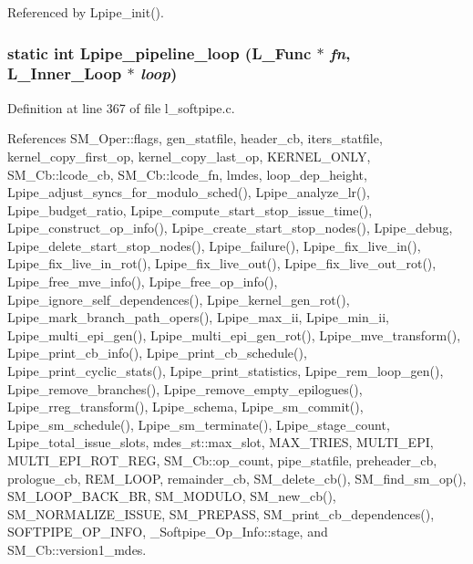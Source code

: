 Referenced by Lpipe\_\-init().
\subsubsection{\setlength{\rightskip}{0pt plus 5cm}static int Lpipe\_\-pipeline\_\-loop (L\_\-Func $\ast$ {\em fn}, L\_\-Inner\_\-Loop $\ast$ {\em loop})\hspace{0.3cm}{\tt  [static]}}\label{l__softpipe_8c_cd9bb1e732e6b1dd2cb4071650da8534}




Definition at line 367 of file l\_\-softpipe.c.

References SM\_\-Oper::flags, gen\_\-statfile, header\_\-cb, iters\_\-statfile, kernel\_\-copy\_\-first\_\-op, kernel\_\-copy\_\-last\_\-op, KERNEL\_\-ONLY, SM\_\-Cb::lcode\_\-cb, SM\_\-Cb::lcode\_\-fn, lmdes, loop\_\-dep\_\-height, Lpipe\_\-adjust\_\-syncs\_\-for\_\-modulo\_\-sched(), Lpipe\_\-analyze\_\-lr(), Lpipe\_\-budget\_\-ratio, Lpipe\_\-compute\_\-start\_\-stop\_\-issue\_\-time(), Lpipe\_\-construct\_\-op\_\-info(), Lpipe\_\-create\_\-start\_\-stop\_\-nodes(), Lpipe\_\-debug, Lpipe\_\-delete\_\-start\_\-stop\_\-nodes(), Lpipe\_\-failure(), Lpipe\_\-fix\_\-live\_\-in(), Lpipe\_\-fix\_\-live\_\-in\_\-rot(), Lpipe\_\-fix\_\-live\_\-out(), Lpipe\_\-fix\_\-live\_\-out\_\-rot(), Lpipe\_\-free\_\-mve\_\-info(), Lpipe\_\-free\_\-op\_\-info(), Lpipe\_\-ignore\_\-self\_\-dependences(), Lpipe\_\-kernel\_\-gen\_\-rot(), Lpipe\_\-mark\_\-branch\_\-path\_\-opers(), Lpipe\_\-max\_\-ii, Lpipe\_\-min\_\-ii, Lpipe\_\-multi\_\-epi\_\-gen(), Lpipe\_\-multi\_\-epi\_\-gen\_\-rot(), Lpipe\_\-mve\_\-transform(), Lpipe\_\-print\_\-cb\_\-info(), Lpipe\_\-print\_\-cb\_\-schedule(), Lpipe\_\-print\_\-cyclic\_\-stats(), Lpipe\_\-print\_\-statistics, Lpipe\_\-rem\_\-loop\_\-gen(), Lpipe\_\-remove\_\-branches(), Lpipe\_\-remove\_\-empty\_\-epilogues(), Lpipe\_\-rreg\_\-transform(), Lpipe\_\-schema, Lpipe\_\-sm\_\-commit(), Lpipe\_\-sm\_\-schedule(), Lpipe\_\-sm\_\-terminate(), Lpipe\_\-stage\_\-count, Lpipe\_\-total\_\-issue\_\-slots, mdes\_\-st::max\_\-slot, MAX\_\-TRIES, MULTI\_\-EPI, MULTI\_\-EPI\_\-ROT\_\-REG, SM\_\-Cb::op\_\-count, pipe\_\-statfile, preheader\_\-cb, prologue\_\-cb, REM\_\-LOOP, remainder\_\-cb, SM\_\-delete\_\-cb(), SM\_\-find\_\-sm\_\-op(), SM\_\-LOOP\_\-BACK\_\-BR, SM\_\-MODULO, SM\_\-new\_\-cb(), SM\_\-NORMALIZE\_\-ISSUE, SM\_\-PREPASS, SM\_\-print\_\-cb\_\-dependences(), SOFTPIPE\_\-OP\_\-INFO, \_\-Softpipe\_\-Op\_\-Info::stage, and SM\_\-Cb::version1\_\-mdes.

